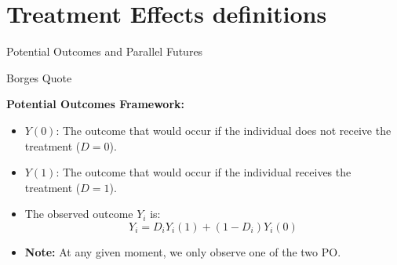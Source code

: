 \documentclass[xcolor=svgnames,t]{beamer}
\begin{document}
\section{Treatment Effects definitions}
\begin{frame}{Potential Outcomes and Parallel Futures}
    \begin{block}{Borges Quote}
    \centering
    \end{block}
    \pause
    \vspace{0.5cm}
    
    \textbf{Potential Outcomes Framework:}
    \begin{itemize}
        \pause
        \item \( Y(0) \): The outcome that would occur if the individual does not receive the treatment (\( D = 0 \)).
        \pause\item \( Y(1) \): The outcome that would occur if the individual receives the treatment (\( D = 1 \)).
        \pause\item The observed outcome \( Y_i \) is:
        \[
        Y_i = D_i Y_i(1) + (1 - D_i) Y_i(0)
        \]
        \pause \item \textbf{Note:} At any given moment, we only observe one of the two PO.
    \end{itemize}
\end{frame}
\end{document}
